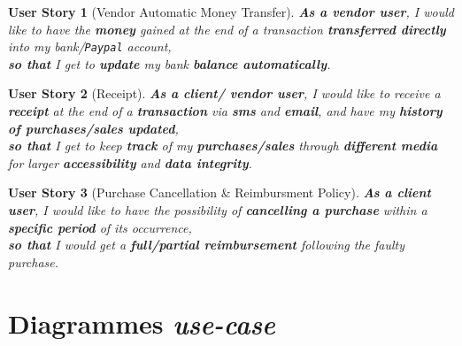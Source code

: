 \documentclass[a4paper,12pt]{book}
\theoremstyle{break}
\newtheorem{userStory}{User Story}
\theoremstyle{break}
\theoremstyle{definition}
\theoremstyle{remark}
\begin{document}
\begin{userStory}[Vendor Automatic Money Transfer]
\textbf{As a {\color{red} vendor} user}, I would like to have the \textbf{money} gained at the end of a transaction \textbf{transferred directly} into my bank/\texttt{Paypal} account,\\
\indent
\textbf{so that} I get to \textbf{update} my bank \textbf{balance automatically}.
\end{userStory}

\begin{userStory}[Receipt]
\textbf{As a {\color{green} client}/{\color{red} vendor} user}, I would like to receive a \textbf{receipt} at the end of a \textbf{transaction} via \textbf{sms} and \textbf{email}, and have my \textbf{history of purchases/sales updated},\\
\indent
\textbf{so that} I get to keep \textbf{track} of my \textbf{purchases/sales} through \textbf{different media} for larger \textbf{accessibility} and \textbf{data integrity}.
\end{userStory}

\begin{userStory}[Purchase Cancellation \& Reimbursment Policy]
\textbf{As a {\color{green} client} user}, I would like to have the possibility of \textbf{cancelling a purchase} within a \textbf{specific period} of its occurrence,\\
\indent
\textbf{so that} I would get a \textbf{full/partial reimbursement} following the faulty purchase.
\end{userStory}

\section{Diagrammes \textit{use-case}}
\end{document}

